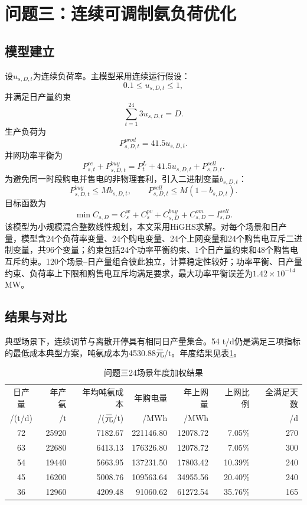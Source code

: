 \documentclass[UTF8,a4paper,12pt]{ctexart}
\begin{document}
\section{问题三：连续可调制氨负荷优化}

\subsection{模型建立}

设$u_{s,D,t}$为连续负荷率。主模型采用连续运行假设：
\[
0.1\le u_{s,D,t}\le 1,
\]
并满足日产量约束
\[
\sum_{t=1}^{24}3u_{s,D,t}=D.
\]
生产负荷为
\[
P^{prod}_{s,D,t}=41.5u_{s,D,t}.
\]
并网功率平衡为
\[
P^{re}_{s,t}+P^{buy}_{s,D,t}=P^L_t+41.5u_{s,D,t}+P^{sell}_{s,D,t}.
\]
为避免同一时段购电并售电的非物理套利，引入二进制变量$b_{s,D,t}$：
\[
P^{buy}_{s,D,t}\le Mb_{s,D,t},\qquad
P^{sell}_{s,D,t}\le M(1-b_{s,D,t}).
\]
目标函数为
\[
\min C_{s,D}=C^w_s+C^{pv}_s+C^{buy}_{s,D}+C^{om}_{s,D}-I^{sell}_{s,D}.
\]
该模型为小规模混合整数线性规划，本文采用HiGHS求解。对每个场景和日产量，模型含24个负荷率变量、24个购电变量、24个上网变量和24个购售电互斥二进制变量，共96个变量；约束包括24个功率平衡约束、1个日产量约束和48个购售电互斥约束。120个场景--日产量组合彼此独立，计算稳定性较好；功率平衡、日产量约束、负荷率上下限和购售电互斥均满足要求，最大功率平衡误差为$1.42\times10^{-14}$ MW。

\subsection{结果与对比}

典型场景下，连续调节与离散开停具有相同日产量集合。54 t/d仍是满足三项指标的最低成本典型方案，吨氨成本为4530.88元/t。年度结果见表\ref{tab:q3_annual}。

\begin{table}[H]
\centering
\caption{问题三24场景年度加权结果}
\label{tab:q3_annual}
\small
\begin{tabular}{c r r r r r r}
\toprule
日产量 & 年产氨 & 年均吨氨成本 & 年购电量 & 年上网量 & 上网比例 & 全满足天数\\
/(t/d) & /t & /(元/t) & /MWh & /MWh & & /d\\
\midrule
72 & 25920 & 7182.67 & 221146.80 & 12078.72 & 7.05\% & 270 \\
63 & 22680 & 6413.13 & 176326.80 & 12078.72 & 7.05\% & 300 \\
54 & 19440 & 5663.95 & 137231.50 & 17803.42 & 10.39\% & 240 \\
45 & 16200 & 5008.76 & 109563.64 & 34955.56 & 20.40\% & 240 \\
36 & 12960 & 4209.48 & 91060.62 & 61272.54 & 35.76\% & 165 \\
\bottomrule
\end{tabular}
\end{table}
\end{document}
